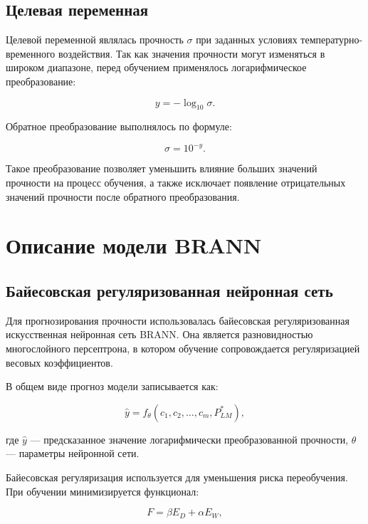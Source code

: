 \subsection{Целевая переменная}

Целевой переменной являлась прочность $\sigma$ при заданных условиях 
температурно-временного воздействия. Так как значения прочности могут 
изменяться в широком диапазоне, перед обучением применялось логарифмическое 
преобразование:

\begin{equation}
y =
-\log_{10}\sigma.
\end{equation}

Обратное преобразование выполнялось по формуле:

\begin{equation}
\sigma =
10^{-y}.
\end{equation}

Такое преобразование позволяет уменьшить влияние больших значений 
прочности на процесс обучения, а также исключает появление 
отрицательных значений прочности после обратного преобразования.

\section{Описание модели BRANN}

\subsection{Байесовская регуляризованная нейронная сеть}

Для прогнозирования прочности использовалась байесовская регуляризованная 
искусственная нейронная сеть BRANN. Она является разновидностью многослойного 
персептрона, в котором обучение сопровождается регуляризацией весовых коэффициентов.

В общем виде прогноз модели записывается как:

\begin{equation}
\hat{y} =
f_{\theta}
\left(
c_1, c_2, \ldots, c_m, P_{LM}^{*}
\right),
\end{equation}

где $\hat{y}$ --- предсказанное значение логарифмически 
преобразованной прочности, $\theta$ --- параметры нейронной сети.

Байесовская регуляризация используется для уменьшения риска переобучения. 
При обучении минимизируется функционал:

\begin{equation}
F =
\beta E_D + \alpha E_W,
\end{equation}

